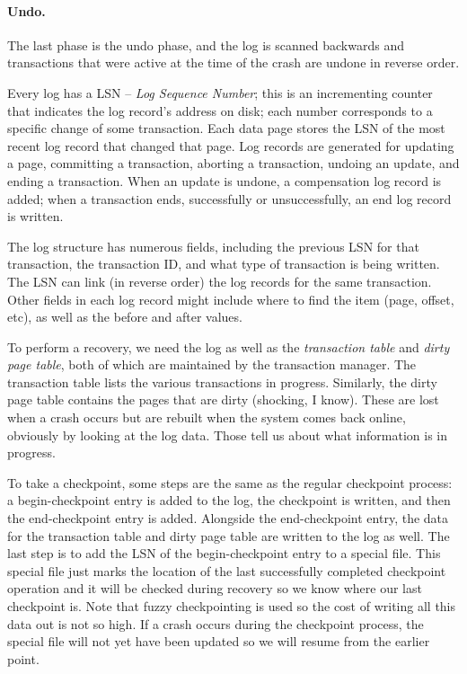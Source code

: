 \paragraph{Undo.} The last phase is the undo phase, and the log is scanned backwards and transactions that were active at the time of the crash are undone in reverse order. 

Every log has a LSN -- \textit{Log Sequence Number}; this is an incrementing counter that indicates the log record's address on disk; each number corresponds to a specific change of some transaction. Each data page stores the LSN of the most recent log record that changed that page. Log records are generated for updating a page, committing a transaction, aborting a transaction, undoing an update, and ending a transaction.  When an update is undone, a compensation log record is added; when a transaction ends, successfully or unsuccessfully, an end log record is written. 

The log structure has numerous fields, including the previous LSN for that transaction, the transaction ID, and what type of transaction is being written. The LSN can link (in reverse order) the log records for the same transaction. Other fields in each log record might include where to find the item (page, offset, etc), as well as the before and after values.

To perform a recovery, we need the log as well as the \textit{transaction table} and \textit{dirty page table}, both of which are maintained by the transaction manager. The transaction table lists the various transactions in progress. Similarly, the dirty page table contains the pages that are dirty (shocking, I know). These are lost when a crash occurs but are rebuilt when the system comes back online, obviously by looking at the log data. Those tell us about what information is in progress.

To take a checkpoint, some steps are the same as the regular checkpoint process: a begin-checkpoint entry is added to the log, the checkpoint is written, and then the end-checkpoint entry is added. Alongside the end-checkpoint entry, the data for the transaction table and dirty page table are written to the log as well. The last step is to add the LSN of the begin-checkpoint entry to a special file. This special file just marks the location of the last successfully completed checkpoint operation and it will be checked during recovery so we know where our last checkpoint is. Note that fuzzy checkpointing is used so the cost of writing all this data out is not so high. If a crash occurs during the checkpoint process, the special file will not yet have been updated so we will resume from the earlier point.

